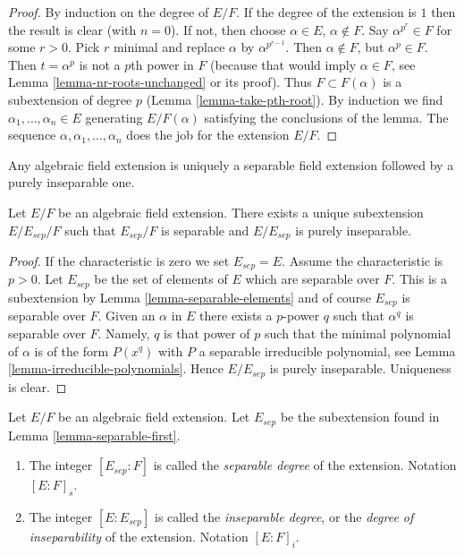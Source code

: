 \begin{proof}
By induction on the degree of $E/F$. If the degree of the extension is $1$
then the result is clear (with $n = 0$). If not, then choose
$\alpha \in E$, $\alpha \not \in F$. Say $\alpha^{p^r} \in F$ for some
$r > 0$. Pick $r$ minimal and replace $\alpha$ by $\alpha^{p^{r - 1}}$.
Then $\alpha \not \in F$, but $\alpha^p \in F$. Then $t = \alpha^p$ is not
a $p$th power in $F$ (because that would imply $\alpha \in F$, see
Lemma \ref{lemma-nr-roots-unchanged} or its proof).
Thus $F \subset F(\alpha)$ is a subextension of degree $p$
(Lemma \ref{lemma-take-pth-root}). By induction we find
$\alpha_1, \ldots, \alpha_n \in E$ generating $E/F(\alpha)$
satisfying the conclusions of the lemma.
The sequence $\alpha, \alpha_1, \ldots, \alpha_n$ does the job
for the extension $E/F$.
\end{proof}

\begin{lemma}
\label{lemma-separable-first}
\begin{slogan}
Any algebraic field extension is uniquely a separable field extension
followed by a purely inseparable one.
\end{slogan}
Let $E/F$ be an algebraic field extension. There exists a unique subextension
$E/E_{sep}/F$ such that $E_{sep}/F$ is separable and $E/E_{sep}$ is
purely inseparable.
\end{lemma}

\begin{proof}
If the characteristic is zero we set $E_{sep} = E$. Assume the characteristic
is $p > 0$. Let $E_{sep}$ be the set of elements of $E$ which are separable
over $F$. This is a subextension by Lemma \ref{lemma-separable-elements}
and of course $E_{sep}$ is separable over $F$. Given an $\alpha$ in $E$
there exists a $p$-power $q$ such that $\alpha^q$ is separable over $F$.
Namely, $q$ is that power of $p$ such that the minimal polynomial of
$\alpha$ is of the form $P(x^q)$ with $P$ a separable irreducible polynomial, see
Lemma \ref{lemma-irreducible-polynomials}. Hence $E/E_{sep}$ is purely
inseparable. Uniqueness is clear.
\end{proof}

\begin{definition}
\label{definition-insep-degree}
Let $E/F$ be an algebraic field extension. Let $E_{sep}$ be the subextension
found in Lemma \ref{lemma-separable-first}.
\begin{enumerate}
\item The integer $[E_{sep} : F]$ is called the {\it separable
degree} of the extension. Notation $[E : F]_s$.
\item The integer $[E : E_{sep}]$ is called the {\it inseparable
degree}, or the {\it degree of inseparability} of the extension.
Notation $[E : F]_i$.
\end{enumerate}
\end{definition}


